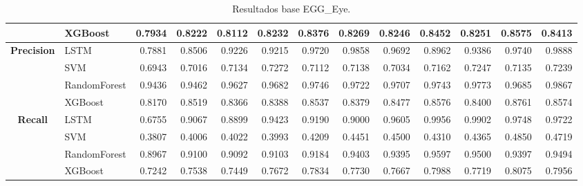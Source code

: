 \begin{table}[h]
\begin{adjustbox}{max width=15cm}
\begin{tabular}{|c|l|r|r|r|r|r|r|r|r|r|r|r|}
			& XGBoost &  0.7934 &  0.8222 &  0.8112 &  0.8232 &  0.8376 &  0.8269 &  0.8246 &  0.8452 &  0.8251 &  0.8575 &  0.8413 \\
			\hline
			\textbf{Precision} & LSTM &  0.7881 &  0.8506 &  0.9226 &  0.9215 &  0.9720 &  0.9858 &  0.9692 &  0.8962 &  0.9386 &  0.9740 &  0.9888 \\
			& SVM &  0.6943 &  0.7016 &  0.7134 &  0.7272 &  0.7112 &  0.7138 &  0.7034 &  0.7162 &  0.7247 &  0.7135 &  0.7239 \\
			& RandomForest &  0.9436 &  0.9462 &  0.9627 &  0.9682 &  0.9746 &  0.9722 &  0.9707 &  0.9743 &  0.9773 &  0.9685 &  0.9867 \\
			& XGBoost &  0.8170 &  0.8519 &  0.8366 &  0.8388 &  0.8537 &  0.8379 &  0.8477 &  0.8576 &  0.8400 &  0.8761 &  0.8574 \\
			\hline
			\textbf{Recall} & LSTM &  0.6755 &  0.9067 &  0.8899 &  0.9423 &  0.9190 &  0.9000 &  0.9605 &  0.9956 &  0.9902 &  0.9748 &  0.9722 \\
			& SVM &  0.3807 &  0.4006 &  0.4022 &  0.3993 &  0.4209 &  0.4451 &  0.4500 &  0.4310 &  0.4365 &  0.4850 &  0.4719 \\
			& RandomForest &  0.8967 &  0.9100 &  0.9092 &  0.9103 &  0.9184 &  0.9403 &  0.9395 &  0.9597 &  0.9500 &  0.9397 &  0.9494 \\
			& XGBoost &  0.7242 &  0.7538 &  0.7449 &  0.7672 &  0.7834 &  0.7730 &  0.7667 &  0.7988 &  0.7719 &  0.8075 &  0.7956 \\
			\hline
		\end{tabular}
	\end{adjustbox}
	\caption{Resultados base EGG\_Eye.}
	\label{tab:EGGEyebase}
\end{table}
